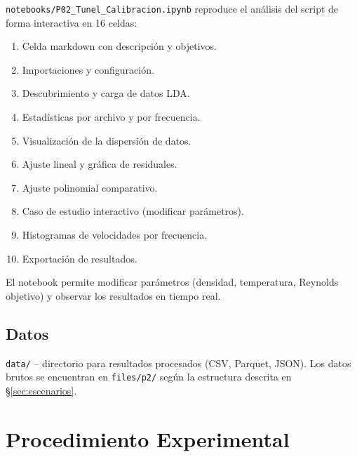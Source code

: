 \documentclass[12pt,a4paper]{article}
\begin{document}
\texttt{notebooks/P02\_Tunel\_Calibracion.ipynb} reproduce el análisis del
script de forma interactiva en 16 celdas:

\begin{enumerate}
	\item Celda markdown con descripción y objetivos.
	\item Importaciones y configuración.
	\item Descubrimiento y carga de datos LDA.
	\item Estadísticas por archivo y por frecuencia.
	\item Visualización de la dispersión de datos.
	\item Ajuste lineal y gráfica de residuales.
	\item Ajuste polinomial comparativo.
	\item Caso de estudio interactivo (modificar parámetros).
	\item Histogramas de velocidades por frecuencia.
	\item Exportación de resultados.
\end{enumerate}

El notebook permite modificar parámetros (densidad, temperatura, Reynolds
objetivo) y observar los resultados en tiempo real.

\subsection{Datos}

\texttt{data/} -- directorio para resultados procesados (CSV, Parquet, JSON).
Los datos brutos se encuentran en \texttt{files/p2/} según la estructura
descrita en §\ref{sec:escenarios}.

\section{Procedimiento Experimental}
\label{sec:procedimiento}
\end{document}
